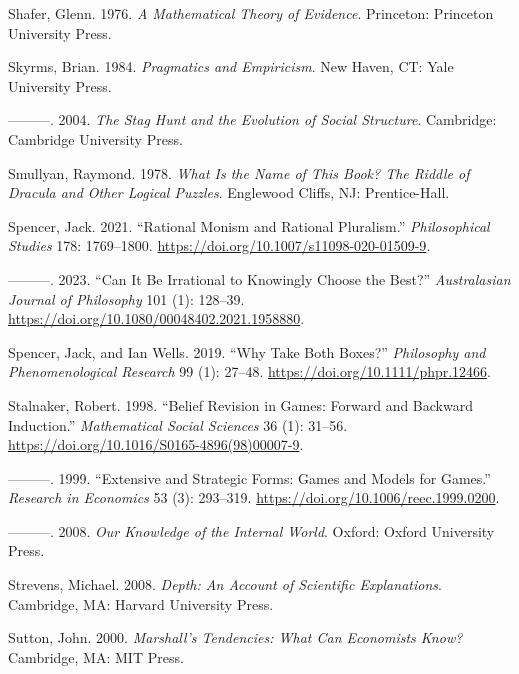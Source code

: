 \documentclass[
  12pt,
  letterpaper,
  DIV=11,
  numbers=noendperiod]{scrreprt}
\newlength{\cslhangindent}
\newenvironment{CSLReferences}[2] %
 {\begin{list}{}{%
  \setlength{\itemindent}{0pt}
  \setlength{\leftmargin}{0pt}
  \setlength{\parsep}{0pt}
  \ifodd #1
   \setlength{\leftmargin}{\cslhangindent}
   \setlength{\itemindent}{-1\cslhangindent}
  \fi
  \setlength{\itemsep}{#2\baselineskip}}}
 {\end{list}}
\begin{document}
\begin{CSLReferences}{1}{0}
Shafer, Glenn. 1976. \emph{A Mathematical Theory of Evidence}.
Princeton: Princeton University Press.

Skyrms, Brian. 1984. \emph{Pragmatics and Empiricism}. New Haven, CT:
Yale University Press.

---------. 2004. \emph{The Stag Hunt and the Evolution of Social
Structure}. Cambridge: {C}ambridge {U}niversity {P}ress.

Smullyan, Raymond. 1978. \emph{What Is the Name of This Book? The Riddle
of Dracula and Other Logical Puzzles}. Englewood Cliffs, NJ:
Prentice-Hall.

Spencer, Jack. 2021. {``Rational Monism and Rational Pluralism.''}
\emph{Philosophical Studies} 178: 1769--1800.
\url{https://doi.org/10.1007/s11098-020-01509-9}.

---------. 2023. {``Can It Be Irrational to Knowingly Choose the
Best?''} \emph{Australasian Journal of Philosophy} 101 (1): 128--39.
\url{https://doi.org/10.1080/00048402.2021.1958880}.

Spencer, Jack, and Ian Wells. 2019. {``Why Take Both Boxes?''}
\emph{{P}hilosophy and {P}henomenological {R}esearch} 99 (1): 27--48.
\url{https://doi.org/10.1111/phpr.12466}.

Stalnaker, Robert. 1998. {``Belief Revision in Games: Forward and
Backward Induction.''} \emph{Mathematical Social Sciences} 36 (1):
31--56. \url{https://doi.org/10.1016/S0165-4896(98)00007-9}.

---------. 1999. {``Extensive and Strategic Forms: Games and Models for
Games.''} \emph{Research in Economics} 53 (3): 293--319.
\url{https://doi.org/10.1006/reec.1999.0200}.

---------. 2008. \emph{Our Knowledge of the Internal World}. Oxford:
Oxford University Press.

Strevens, Michael. 2008. \emph{Depth: An Account of Scientific
Explanations}. Cambridge, MA: Harvard University Press.

Sutton, John. 2000. \emph{Marshall's Tendencies: What Can Economists
Know?} Cambridge, MA: {MIT} Press.


\end{CSLReferences}
\end{document}
